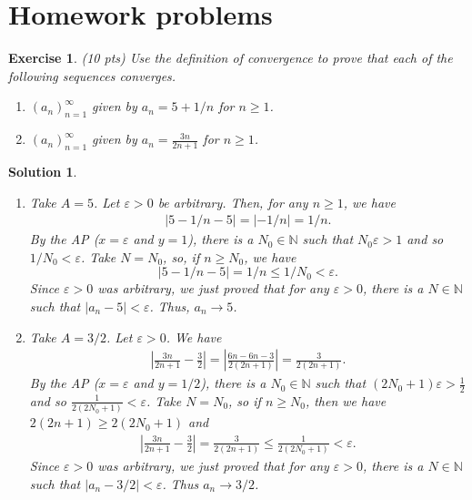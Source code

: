 \documentclass[12pt]{article}
\newcommand{\bR}{\mathbb{R}}
\newcommand{\bN}{\mathbb{N}}
\newcommand{\ra}{\rightarrow}
\theoremstyle{plain}
\newtheorem{exer}{\textbf{Exercise}}}
\theoremstyle{plain}
\newtheorem*{sol}{\textbf{Solution}}}
\theoremstyle{plain}
\theoremstyle{plain}
\begin{document}
\section{Homework problems}

\begin{exer}
(10 pts)
Use the definition of convergence to prove that each of the following sequences converges.
	\begin{enumerate}[label=\textbf{\alph*)}]
	\item $(a_n )_{n = 1}^\infty$ given by $a_n = 5 + 1/n$ for $n \geq 1$.
	\item $(a_n)_{n = 1}^\infty$ given by $a_n = \frac{3n}{2n + 1}$ for $n \geq 1$.
	\end{enumerate}
\end{exer}
\begin{sol}
\begin{enumerate}[label=\textbf{\alph*)}]
\item Take $A = 5$. Let $\varepsilon > 0$ be arbitrary. Then, for any $n \geq 1$, we have
	\begin{align*}
	|5 - 1/n - 5| = |-1/n| = 1/n .
	\end{align*}
By the AP ($x = \varepsilon$ and $y= 1$), there is a $N_0 \in \bN$ such that $N_0 \varepsilon > 1$ and so $1/N_0 < \varepsilon$. Take $N = N_0$, so, if $n \geq N_0$, we have
	$$
	|5 - 1/n - 5| = 1/n \leq 1/N_0 < \varepsilon .
	$$
Since $\varepsilon > 0$ was arbitrary, we just proved that for any $\varepsilon > 0$, there is a $N \in \bN$ such that $|a_n - 5| < \varepsilon$. Thus, $a_n \ra 5$.
\item Take $A = 3/2$. Let $\varepsilon > 0$. We have
	\begin{align*}
	\left| \frac{3n}{2n + 1} - \frac{3}{2} \right| = \left| \frac{6n - 6n - 3}{2 (2n + 1)} \right| = \frac{3}{2 (2n + 1)} .
	\end{align*}
By the AP ($x = \varepsilon$ and $y = 1/2$), there is a $N_0 \in \bN$ such that $(2N_0 + 1)\varepsilon > \frac{1}{2}$ and so $\frac{1}{2 (2N_0 + 1)} < \varepsilon$. Take $N = N_0$, so if $n \geq N_0$, then we have $2 (2n + 1) \geq 2(2N_0 + 1)$ and
	\begin{align*}
	\left| \frac{3n}{2n + 1} - \frac{3}{2} \right| = \frac{3}{2 (2n + 1)}  \leq \frac{1}{2 (2N_0 + 1)} < \varepsilon .
	\end{align*}
Since $\varepsilon > 0$ was arbitrary, we just proved that for any $\varepsilon > 0$, there is a $N \in \bN$ such that $|a_n - 3/2| < \varepsilon$. Thus $a_n \ra 3/2$.
\end{enumerate}
\end{sol}
\end{document}
